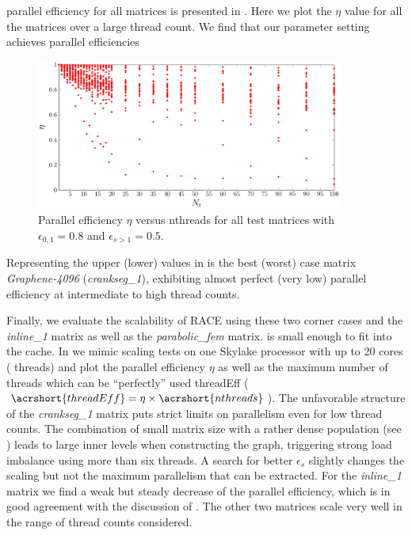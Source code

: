 parallel efficiency for all matrices is presented
in . Here we plot the $\eta$ value for all the
matrices over a large thread count. We find that our parameter setting achieves
parallel efficiencies 
   \begin{figure}[t]
   	\centering
   	\includegraphics[width=0.9\textwidth]{pics/param_study/scatter_plot}
   	\caption{Parallel efficiency $\eta$ versus \acrshort{nthreads} for all test matrices with $\epsilon_{0,1} = 0.8$ and $\epsilon_{s>1} = 0.5$.}
  	\label{fig:param_all_mtx_stat}
   \end{figure}
Representing the upper (lower) values in  is the
best (worst) case matrix \emph{Graphene-4096} (\emph{crankseg\_1}), exhibiting
almost perfect (very low) parallel efficiency at intermediate to high thread
counts.

Finally, we evaluate the scalability of RACE using these two corner cases and
the \emph{inline\_1} matrix as well as the \emph{parabolic\_fem} matrix.
 
is small enough to fit into the cache.  In  we
mimic scaling tests on one Skylake processor with up to 20 cores (\ie
threads) and plot the parallel efficiency $\eta$ as well as the maximum number
of threads which can be ``perfectly'' used \acrshort{threadEff} (\ie
$\acrshort{threadEff} = \eta\times\acrshort{nthreads}$).  The unfavorable structure
of the \emph{crankseg\_1} matrix puts strict limits on parallelism even for low
thread counts.  The combination of small matrix size with a rather dense
population (see ) leads to large inner levels when
constructing the graph, triggering strong load imbalance  
 using more than six threads.
A search for better $\epsilon_s$ slightly changes the 
scaling  but not the maximum parallelism that can be extracted. 
For the \emph{inline\_1} matrix we find a weak but steady decrease of the parallel
efficiency, which is in good agreement with the discussion
of . The other two matrices scale very well in the
range of thread counts considered.



